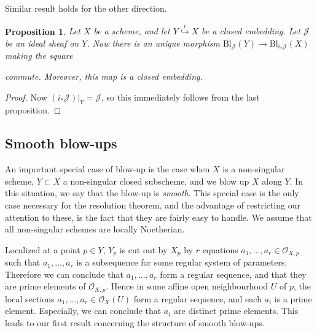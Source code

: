 \documentclass[12pt,a4paper,leqno]{article}
\newcommand{\OO}{\mathcal{O}}
\newcommand{\bl}{\mathrm{Bl}}
\theoremstyle{plain}
\newtheorem{prop}[theo]{Proposition}
\theoremstyle{definition}
\theoremstyle{remark}
\begin{document}
Similar result holds for the other direction.

\begin{prop}
Let $X$ be a scheme, and let $Y \stackrel{i}{\hookrightarrow} X$ be a closed embedding. Let $\mathscr{J}$ be an ideal sheaf on $Y$. Now there is an unique morphism $\bl_{\mathscr{J}}(Y) \to \bl_{i_*\mathscr{J}}(X)$ making the square
\begin{center}
\end{center}
commute. Moreover, this map is a closed embedding.
\end{prop}
\begin{proof}
Now $(i_*\mathscr{J})|_Y = \mathscr{J}$, so this immediately follows from the last proposition.
\end{proof}

\subsection{Smooth blow-ups}

An important special case of blow-up is the case when $X$ is a non-singular scheme, $Y \subset X$ a non-singular closed subscheme, and we blow up $X$ along $Y$. In this situation, we say that the blow-up is \emph{smooth}. This special case is the only case necessary for the resolution theorem, and the advantage of restricting our attention to these, is the fact that they are fairly easy to handle. We assume that all non-singular schemes are locally Noetherian.

Localized at a point $p \in Y$, $Y_p$ is cut out by $X_p$ by $r$ equations $a_1,...,a_r \in \OO_{X,p}$ such that $a_1,...,a_r$ is a subsequence for some regular system of parameters. Therefore we can conclude that $a_1, ..., a_r$ form a regular sequence, and that they are prime elements of $\OO_{X,p}$. Hence in some affine open neighbourhood $U$ of $p$, the local sections $a_1,...,a_r \in \OO_X(U)$ form a regular sequence, and each $a_i$ is a prime element. Especially, we can conclude that $a_i$ are distinct prime elements. This leads to our first result concerning the structure of smooth blow-ups.
\end{document}
